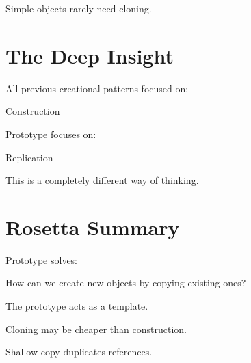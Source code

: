 \documentclass[11pt,a4paper]{book}
\begin{document}
Simple objects rarely need cloning.


\section{The Deep Insight}

\begin{idea}

All previous creational patterns focused on:

\begin{center}
Construction
\end{center}

Prototype focuses on:

\begin{center}
Replication
\end{center}

This is a completely different way of thinking.

\end{idea}


\section{Rosetta Summary}

\begin{rosettarule}

Prototype solves:

\begin{center}
How can we create new objects by copying
existing ones?
\end{center}

\end{rosettarule}

\begin{rosettarule}

The prototype acts as a template.

\end{rosettarule}

\begin{rosettarule}

Cloning may be cheaper than construction.

\end{rosettarule}

\begin{rosettarule}

Shallow copy duplicates references.

\end{rosettarule}
\end{document}
